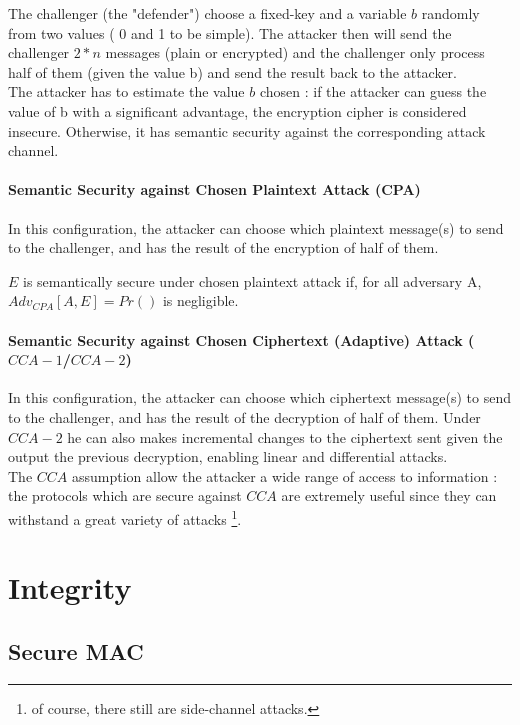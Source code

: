 The challenger (the "defender") choose a fixed-key and a variable $b$ randomly from two values ( 0 and 1 to be simple). The attacker then will send the challenger $2*n$ messages (plain or encrypted) and the challenger only process half of them (given the value b) and send the result back to the attacker.\\
The attacker has to estimate the value $b$ chosen : if the attacker can guess the value of b with a significant advantage, the encryption cipher is considered insecure. Otherwise, it has semantic security against the corresponding attack channel.

\paragraph{Semantic Security against Chosen Plaintext Attack (CPA)\\}

In this configuration, the attacker can choose which plaintext message(s) to send to the challenger, and has the result of the encryption of half of them. 

\begin{mytheorem}
    $E$ is semantically secure  under chosen plaintext attack if, for all adversary A, $Adv_{CPA}[A,E] = Pr()$ is negligible.
\end{mytheorem}

\paragraph{Semantic Security against Chosen Ciphertext (Adaptive) Attack ($CCA-1$/$CCA-2$)\\}

In this configuration, the attacker can choose which ciphertext message(s) to send to the challenger, and has the result of the decryption of half of them. Under $CCA-2$ he can also makes incremental changes to the ciphertext sent given the output the previous decryption, enabling linear and differential attacks. \\
The $CCA$ assumption allow the attacker a wide range of access to information : the protocols which are secure against $CCA$ are extremely useful since they can withstand a great variety of attacks \footnote{of course, there still are side-channel attacks.}.

\section{Integrity}
\subsection{Secure MAC}


